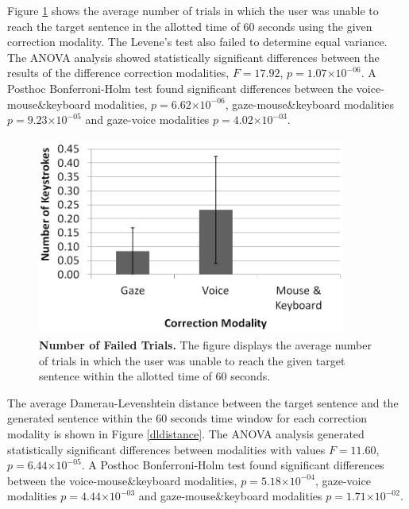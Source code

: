 \documentclass[]{article}
\providecommand{\e}[1]{\ensuremath{\times 10^{#1}}}
\begin{document}
Figure \ref{failFig} shows the average number of trials in which the user was unable to reach the target sentence in the
allotted time of 60 seconds using the given correction modality. The Levene's test also failed to determine equal
variance. The ANOVA analysis showed statistically significant differences between the results of the
difference correction modalities, $F=17.92$, $p=1.07\e{-06}$.   A Posthoc Bonferroni-Holm test found
significant differences between the voice-mouse\&keyboard modalities, $p=6.62\e{-06}$, gaze-mouse\&keyboard modalities
$p=9.23\e{-05}$ and gaze-voice modalities $p=4.02\e{-03}$.


\begin{figure}[ht]
\begin{center}
\vspace{-3mm}
\includegraphics[width=0.9\textwidth,height=65mm]{figures/fail.png}
\end{center}
\caption{\textbf{Number of Failed Trials.} The figure displays the average number of trials in which the user
was unable to reach the given target sentence within the allotted time of 60 seconds.}
\label{failFig}
\end{figure}




The average Damerau-Levenshtein distance between the target sentence and the generated sentence within the 60 seconds time window for
each correction modality is shown in Figure \ref{dldistance}. The ANOVA analysis generated statistically
significant differences between modalities with values $F=11.60$, $p=6.44\e{-05}$. A Posthoc Bonferroni-Holm test found
significant differences between the voice-mouse\&keyboard modalities, $p=5.18\e{-04}$, gaze-voice modalities
$p=4.44\e{-03}$ and gaze-mouse\&keyboard modalities $p=1.71\e{-02}$. 
\end{document}
